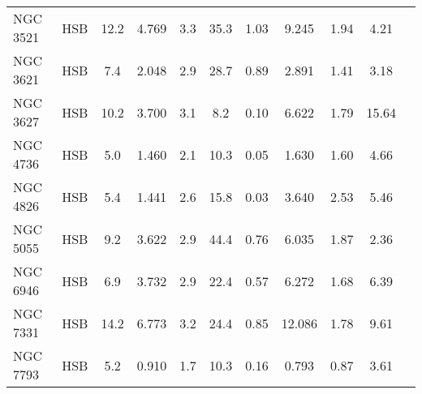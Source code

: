 \documentclass[preprint,aps]{revtex4}
\begin{document}
\begin{table}
\begin{tabular}{l c c c c c c c c c c}
\\
NGC 3521 &HSB& 12.2&   4.769  & 3.3 & 35.3 & 1.03 & \phantom{0}9.245 & 1.94
&\phantom{0}4.21&\cite{deBlok2008} \cite{Walter2008} \cite{Leroy2008} \cite{Walter2008}   
\\
NGC 3621 &HSB& \phantom{0}7.4 &   2.048   & 2.9 & 28.7 & 0.89 & \phantom{0}2.891 & 1.41
&\phantom{0}3.18&\cite{deBlok2008} \cite{Walter2008} \cite{deBlok2008} \cite{Walter2008}
\\
NGC 3627 &HSB&10.2 &  3.700    & 3.1 &\phantom{0}8.2 & 0.10 & \phantom{0}6.622 & 1.79 &
15.64&\cite{deBlok2008} \cite{Walter2008} \cite{Leroy2008} \cite{Walter2008}    
\\
NGC 4736 &HSB&\phantom{0}5.0 &    1.460  & 2.1 & 10.3 & 0.05 & \phantom{0}1.630 & 1.60
&\phantom{0}4.66&\cite{deBlok2008} \cite{Walter2008} \cite{deBlok2008} \cite{Walter2008}   
\\
NGC 4826 &HSB& \phantom{0}5.4 &   1.441   & 2.6 & 15.8 & 0.03 & \phantom{0}3.640 & 2.53
&\phantom{1}5.46&\cite{deBlok2008} \cite{Walter2008} \cite{Regan2006} \cite{Walter2008}
\\
NGC 5055 &HSB& \phantom{0}9.2&  3.622    &2.9 & 44.4 &0.76& \phantom{0}6.035 & 1.87& 
\phantom{0}2.36&\cite{deBlok2008} \cite{Walter2008} \cite{Leroy2008} \cite{Walter2008}   
\\
NGC 6946 &HSB& \phantom{0}6.9 & 3.732     & 2.9 & 22.4 & 0.57 & \phantom{0}6.272 &
1.68&\phantom{0}6.39 &\cite{deBlok2008} \cite{Walter2008} \cite{Leroy2008} \cite{Walter2008}   
\\
NGC 7331 &HSB& 14.2 &  6.773    & 3.2 & 24.4 & 0.85 & 12.086 & 1.78&\phantom{0}9.61&\cite{deBlok2008} \cite{Walter2008} \cite{Leroy2008} \cite{Walter2008}   
\\
NGC 7793 &HSB& \phantom{0}5.2 &   0.910   & 1.7 & 10.3 & 0.16 &\phantom{0}0.793 & 0.87
&\phantom{1}3.61 &\cite{deBlok2008} \cite{Walter2008} \cite{Leroy2008} \cite{Walter2008} 
\\
\hline
\end{tabular}
\label{table:things}
\end{table}







\voffset=-0.5in
\end{document}

